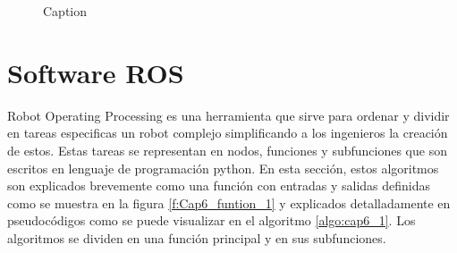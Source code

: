 \begin{center}
\begin{figure}[h!]
    \caption{Caption}
    \label{fig:cap6_intro_2}
    \end{figure}
    \end{center}

     \newpage


\section{Software ROS}

    Robot Operating Processing es una herramienta que sirve para ordenar y dividir en tareas especificas un robot complejo simplificando a los ingenieros la creación de estos. Estas tareas se representan en nodos, funciones y subfunciones que son escritos en lenguaje de programación python. En esta sección, estos algoritmos son explicados brevemente como una función con entradas y salidas definidas como se muestra en la figura \ref{f:Cap6_funtion_1} y explicados detalladamente en pseudocódigos como se puede visualizar en el algoritmo \ref{algo:cap6_1}. Los algoritmos se dividen en una función principal y en sus subfunciones.
    
